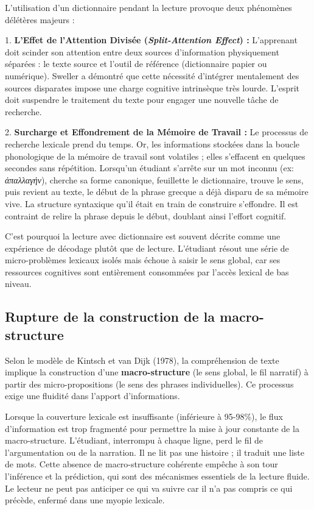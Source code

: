 {L'utilisation d'un dictionnaire pendant la lecture provoque deux phénomènes délétères majeurs :

1. \textbf{L'Effet de l'Attention Divisée (\textit{Split-Attention Effect}) :} L'apprenant doit
scinder son attention entre deux sources d'information physiquement séparées : le texte source et
l'outil de référence (dictionnaire papier ou numérique). Sweller a démontré que cette nécessité
d'intégrer mentalement des sources disparates impose une charge cognitive intrinsèque très lourde.
L'esprit doit \og suspendre\fg{} le traitement du texte pour engager une nouvelle tâche de
recherche.\cite{II-3-2-ref19}

2. \textbf{Surcharge et Effondrement de la Mémoire de Travail :} Le processus de recherche lexicale
prend du temps. Or, les informations stockées dans la boucle phonologique de la mémoire de travail
sont volatiles ; elles s'effacent en quelques secondes sans répétition. Lorsqu'un étudiant s'arrête
sur un mot inconnu (ex: \textit{ἀπαλλαγήν}), cherche sa forme canonique, feuillette le dictionnaire,
trouve le sens, puis revient au texte, le début de la phrase grecque a déjà disparu de sa mémoire
vive. La structure syntaxique qu'il était en train de construire s'effondre. Il est contraint de
relire la phrase depuis le début, doublant ainsi l'effort cognitif.\cite{II-3-2-ref21}

C'est pourquoi la lecture avec dictionnaire est souvent décrite comme une expérience de \og
décodage\fg{} plutôt que de lecture. L'étudiant résout une série de micro-problèmes lexicaux isolés
mais échoue à saisir le sens global, car ses ressources cognitives sont entièrement consommées par
l'accès lexical de bas niveau.\cite{II-3-2-ref23}



\subsection{Rupture de la construction de la macro-structure}

Selon le modèle de Kintsch et van Dijk (1978), la compréhension de texte implique la construction
d'une \textbf{macro-structure} (le sens global, le fil narratif) à partir des micro-propositions (le
sens des phrases individuelles). Ce processus exige une fluidité dans l'apport
d'informations.\cite{II-3-2-ref25}

Lorsque la couverture lexicale est insuffisante (inférieure à 95-98\%), le flux d'information est
trop fragmenté pour permettre la mise à jour constante de la macro-structure. L'étudiant, interrompu
à chaque ligne, perd le fil de l'argumentation ou de la narration. Il ne \og lit\fg{} pas une
histoire ; il traduit une liste de mots. Cette absence de macro-structure cohérente empêche à son
tour l'inférence et la prédiction, qui sont des mécanismes essentiels de la lecture fluide. Le
lecteur ne peut pas anticiper ce qui va suivre car il n'a pas compris ce qui précède, enfermé dans
une myopie lexicale.\cite{II-3-2-ref25}



}
